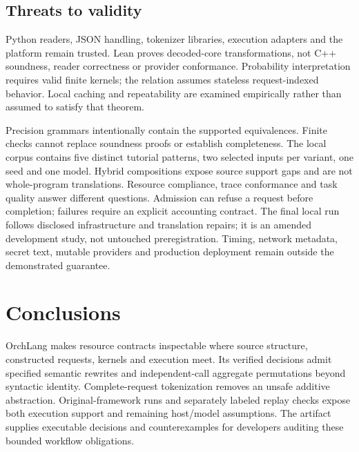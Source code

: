 \documentclass[preprint,12pt,a4paper]{elsarticle}
\begin{document}
\begin{table}[!ht]
\centering\small

\caption{Descriptive nonempty source lines (including comments), executable
kernel lines, source input/cap annotations, and host case lines. Shared drivers
and the kernel interpreter are counted separately in the supplement. These
counts do not measure human adaptation time or code reduction.}
\label{tab:annotations}
\end{table}

\subsection{Threats to validity}
Python readers, JSON handling, tokenizer libraries, execution adapters and the
platform remain trusted. Lean proves decoded-core transformations, not C++
soundness, reader correctness or provider conformance. Probability
interpretation requires valid finite kernels; the relation assumes stateless
request-indexed behavior. Local caching and repeatability are examined
empirically rather than assumed to satisfy that theorem.

Precision grammars intentionally contain the supported equivalences.
Finite checks cannot replace soundness proofs or establish completeness.
The local corpus contains five distinct tutorial patterns, two selected inputs
per variant, one seed and one model. Hybrid compositions expose source support
gaps and are not whole-program translations. Resource compliance, trace
conformance and task quality answer different questions. Admission can refuse
a request before completion; failures require an explicit accounting contract.
The final local run follows disclosed infrastructure and translation repairs;
it is an amended development study, not untouched preregistration.
Timing, network metadata, secret text, mutable providers and production
deployment remain outside the demonstrated guarantee.

\section{Conclusions}
OrchLang makes resource contracts inspectable where source structure,
constructed requests, kernels and execution meet. Its verified decisions
admit specified semantic rewrites and independent-call aggregate permutations
beyond syntactic identity. Complete-request tokenization removes an unsafe
additive abstraction. Original-framework runs and separately labeled replay
checks expose both execution support and remaining host/model assumptions.
The artifact supplies executable decisions and counterexamples for developers
auditing these bounded workflow obligations.
\end{document}

